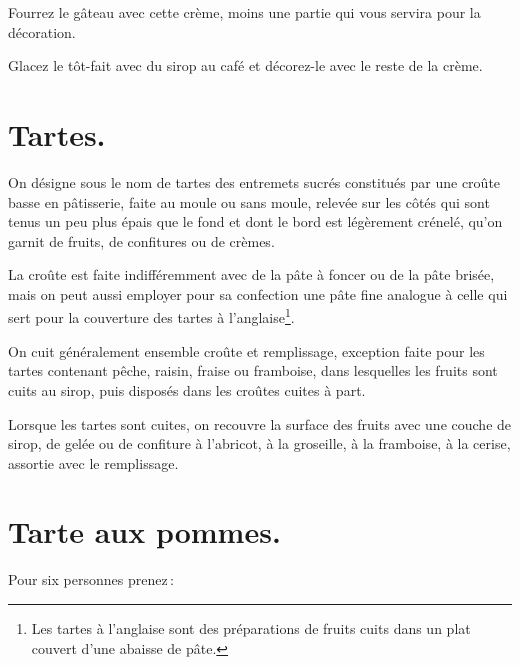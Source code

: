 Fourrez le gâteau avec cette crème, moins une partie qui vous servira pour la
décoration.

Glacez le tôt-fait avec du sirop au café et décorez-le avec le reste de la crème.

\section*{\centering Tartes.}
{}

On désigne sous le nom de tartes des entremets sucrés constitués par une croûte
basse en pâtisserie, faite au moule ou sans moule, relevée sur les côtés qui sont
tenus un peu plus épais que le fond et dont le bord est légèrement crénelé, qu'on
garnit de fruits, de confitures ou de crèmes.

La croûte est faite indifféremment avec de la pâte à foncer ou de la pâte
brisée, mais on peut aussi employer pour sa confection une pâte fine analogue
à celle qui sert pour la couverture des tartes à l'anglaise\footnote{Les tartes
à l'anglaise sont des préparations de fruits cuits dans un plat couvert d'une
abaisse de pâte.}.

On cuit généralement ensemble croûte et remplissage, exception faite pour les
tartes contenant pêche, raisin, fraise ou framboise, dans lesquelles les fruits sont
cuits au sirop, puis disposés dans les croûtes cuites à part.

Lorsque les tartes sont cuites, on recouvre la surface des fruits avec une
couche de sirop, de gelée ou de confiture à l’abricot, à la groseille, à la
framboise, à la cerise, assortie avec le remplissage.

\section*{\centering Tarte aux pommes.}
{}

Pour six personnes prenez :

